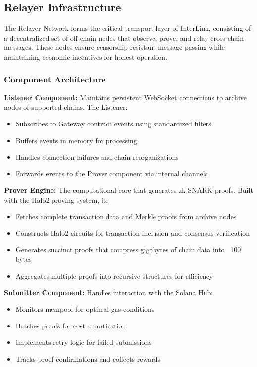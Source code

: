\documentclass[11pt,a4paper]{article}
\begin{document}
\subsection{Relayer Infrastructure}

The Relayer Network forms the critical transport layer of InterLink, consisting of a decentralized set of off-chain nodes that observe, prove, and relay cross-chain messages. These nodes ensure censorship-resistant message passing while maintaining economic incentives for honest operation.

\subsubsection{Component Architecture}

\textbf{Listener Component:} Maintains persistent WebSocket connections to archive nodes of supported chains. The Listener:
\begin{itemize}
    \item Subscribes to Gateway contract events using standardized filters
    \item Buffers events in memory for processing
    \item Handles connection failures and chain reorganizations
    \item Forwards events to the Prover component via internal channels
\end{itemize}

\textbf{Prover Engine:} The computational core that generates zk-SNARK proofs. Built with the Halo2 proving system, it:
\begin{itemize}
    \item Fetches complete transaction data and Merkle proofs from archive nodes
    \item Constructs Halo2 circuits for transaction inclusion and consensus verification
    \item Generates succinct proofs that compress gigabytes of chain data into ~100 bytes
    \item Aggregates multiple proofs into recursive structures for efficiency
\end{itemize}

\textbf{Submitter Component:} Handles interaction with the Solana Hub:
\begin{itemize}
    \item Monitors mempool for optimal gas conditions
    \item Batches proofs for cost amortization
    \item Implements retry logic for failed submissions
    \item Tracks proof confirmations and collects rewards
\end{itemize}
\end{document}
